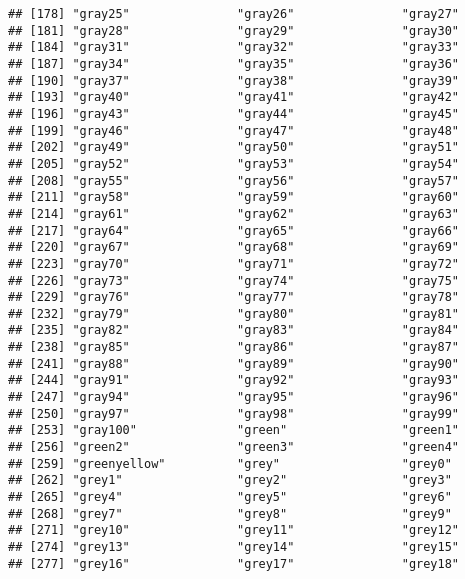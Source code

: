 \documentclass[
]{article}
\begin{document}
\begin{verbatim}
## [178] "gray25"               "gray26"               "gray27"              
## [181] "gray28"               "gray29"               "gray30"              
## [184] "gray31"               "gray32"               "gray33"              
## [187] "gray34"               "gray35"               "gray36"              
## [190] "gray37"               "gray38"               "gray39"              
## [193] "gray40"               "gray41"               "gray42"              
## [196] "gray43"               "gray44"               "gray45"              
## [199] "gray46"               "gray47"               "gray48"              
## [202] "gray49"               "gray50"               "gray51"              
## [205] "gray52"               "gray53"               "gray54"              
## [208] "gray55"               "gray56"               "gray57"              
## [211] "gray58"               "gray59"               "gray60"              
## [214] "gray61"               "gray62"               "gray63"              
## [217] "gray64"               "gray65"               "gray66"              
## [220] "gray67"               "gray68"               "gray69"              
## [223] "gray70"               "gray71"               "gray72"              
## [226] "gray73"               "gray74"               "gray75"              
## [229] "gray76"               "gray77"               "gray78"              
## [232] "gray79"               "gray80"               "gray81"              
## [235] "gray82"               "gray83"               "gray84"              
## [238] "gray85"               "gray86"               "gray87"              
## [241] "gray88"               "gray89"               "gray90"              
## [244] "gray91"               "gray92"               "gray93"              
## [247] "gray94"               "gray95"               "gray96"              
## [250] "gray97"               "gray98"               "gray99"              
## [253] "gray100"              "green"                "green1"              
## [256] "green2"               "green3"               "green4"              
## [259] "greenyellow"          "grey"                 "grey0"               
## [262] "grey1"                "grey2"                "grey3"               
## [265] "grey4"                "grey5"                "grey6"               
## [268] "grey7"                "grey8"                "grey9"               
## [271] "grey10"               "grey11"               "grey12"              
## [274] "grey13"               "grey14"               "grey15"              
## [277] "grey16"               "grey17"               "grey18"              

\end{verbatim}
\end{document}
